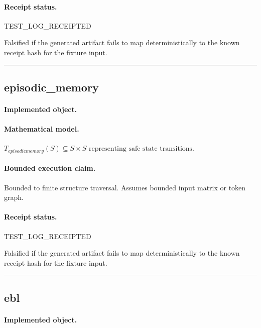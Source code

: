\paragraph{Receipt status.} TEST\_LOG\_RECEIPTED
\begin{falsifier}
Falsified if the generated artifact fails to map deterministically to the known receipt hash for the fixture input.
\end{falsifier}

\vspace{1em}\hrule\vspace{1em}
\subsection{episodic\_memory}
\paragraph{Implemented object.} 
\paragraph{Mathematical model.} $T_{episodicmemory}(S) \subseteq S \times S \text{ representing safe state transitions}.$
\paragraph{Bounded execution claim.} Bounded to finite structure traversal. Assumes bounded input matrix or token graph.
\paragraph{Receipt status.} TEST\_LOG\_RECEIPTED
\begin{falsifier}
Falsified if the generated artifact fails to map deterministically to the known receipt hash for the fixture input.
\end{falsifier}

\vspace{1em}\hrule\vspace{1em}
\subsection{ebl}
\paragraph{Implemented object.} 
